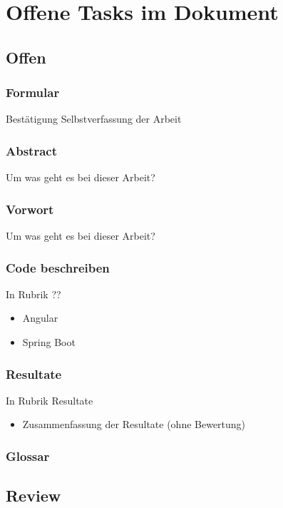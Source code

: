 \documentclass[../main.tex]{subfiles}
\begin{document}
	\section*{Offene Tasks im Dokument}
	\subsection{Offen}
	
	\subsubsection{Formular}
	Bestätigung Selbstverfassung der Arbeit
	
	\subsubsection{Abstract}
	Um was geht es bei dieser Arbeit?
	
	\subsubsection{Vorwort}
	Um was geht es bei dieser Arbeit?
	
	\subsubsection{Code beschreiben}
	In Rubrik ??
	\begin{itemize}
		\item Angular
		\item Spring Boot
	\end{itemize}
	
	\subsubsection{Resultate}
	In Rubrik Resultate
	\begin{itemize}
		\item Zusammenfassung der Resultate (ohne Bewertung)
	\end{itemize}
	
	
	\subsubsection{Glossar}
	
	
	\subsection{Review}
\end{document}
